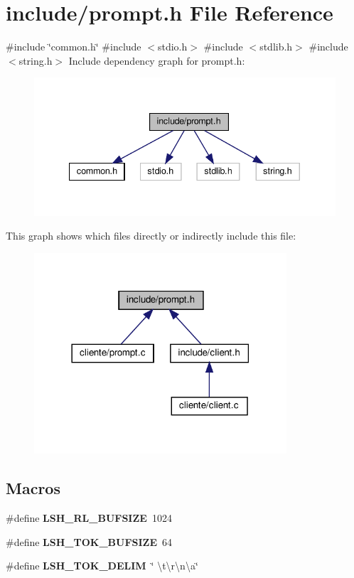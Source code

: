 \section{include/prompt.h File Reference}
\label{prompt_8h}
{\ttfamily \#include \char`\"{}common.\+h\char`\"{}}\newline
{\ttfamily \#include $<$stdio.\+h$>$}\newline
{\ttfamily \#include $<$stdlib.\+h$>$}\newline
{\ttfamily \#include $<$string.\+h$>$}\newline
Include dependency graph for prompt.\+h\+:\nopagebreak
\begin{figure}[H]
\begin{center}
\leavevmode
\includegraphics[width=340pt]{prompt_8h__incl}
\end{center}
\end{figure}
This graph shows which files directly or indirectly include this file\+:\nopagebreak
\begin{figure}[H]
\begin{center}
\leavevmode
\includegraphics[width=266pt]{prompt_8h__dep__incl}
\end{center}
\end{figure}
\subsection*{Macros}
\begin{DoxyCompactItemize}
\item 
\#define \textbf{ L\+S\+H\+\_\+\+R\+L\+\_\+\+B\+U\+F\+S\+I\+ZE}~1024
\item 
\#define \textbf{ L\+S\+H\+\_\+\+T\+O\+K\+\_\+\+B\+U\+F\+S\+I\+ZE}~64
\item 
\#define \textbf{ L\+S\+H\+\_\+\+T\+O\+K\+\_\+\+D\+E\+L\+IM}~\char`\"{} \textbackslash{}t\textbackslash{}r\textbackslash{}n\textbackslash{}a\char`\"{}
\end{DoxyCompactItemize}
